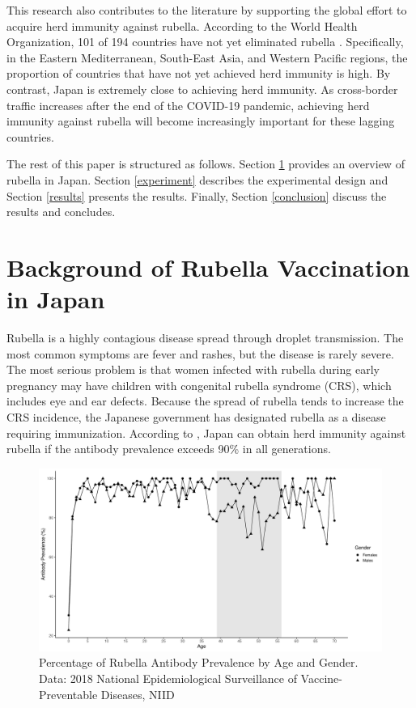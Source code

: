 \documentclass[
  11pt,
  a4paper
]{article}
\begin{document}
This research also contributes to the literature by supporting the global effort to acquire herd immunity against rubella. According to the World Health Organization, 101 of 194 countries have not yet eliminated rubella \citep{Zimmerman2022}. Specifically, in the Eastern Mediterranean, South-East Asia, and Western Pacific regions, the proportion of countries that have not yet achieved herd immunity is high. By contrast, Japan is extremely close to achieving herd immunity. As cross-border traffic increases after the end of the COVID-19 pandemic, achieving herd immunity against rubella will become increasingly important for these lagging countries.

The rest of this paper is structured as follows. Section \ref{background} provides an overview of rubella in Japan. Section \ref{experiment} describes the experimental design and Section \ref{results} presents the results. Finally, Section \ref{conclusion} discuss the results and concludes.

\hypertarget{background}{%
\section{Background of Rubella Vaccination in Japan}\label{background}}

Rubella is a highly contagious disease spread through droplet transmission. The most common symptoms are fever and rashes, but the disease is rarely severe. The most serious problem is that women infected with rubella during early pregnancy may have children with congenital rubella syndrome (CRS), which includes eye and ear defects. Because the spread of rubella tends to increase the CRS incidence, the Japanese government has designated rubella as a disease requiring immunization. According to \citet{Kinoshita2016}, Japan can obtain herd immunity against rubella if the antibody prevalence exceeds 90\% in all generations.

\begin{figure}[t]
\includegraphics{Main-Document-LaTeX_files/figure-latex/antibody-1} \caption{Percentage of Rubella Antibody Prevalence by Age and Gender. Data: 2018 National Epidemiological Surveillance of Vaccine-Preventable Diseases, NIID}\label{fig:antibody}
\end{figure}
\end{document}
